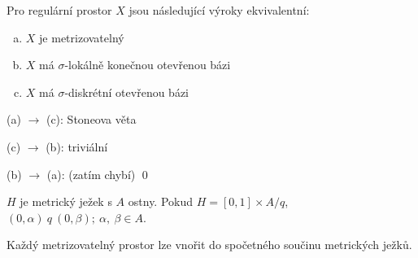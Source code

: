 \documentclass[12pt,a4paper]{article}
\newcommand{\head}[1]{\medskip\noindent {\bf #1}}
\begin{document}
 Pro regulární prostor $X$ jsou následující výroky
	ekvivalentní:
	\begin{enumerate}[(a)]
		\item $X$ je metrizovatelný
		\item $X$ má $\sigma$-lokálně konečnou otevřenou bázi
		\item $X$ má $\sigma$-diskrétní otevřenou bázi
	\end{enumerate}
\dukaz (a) $\rightarrow$ (c): Stoneova věta

(c) $\rightarrow$ (b): triviální

(b) $\rightarrow$ (a): (zatím chybí)
\qed

 $H$ je metrický ježek s $A$ ostny. Pokud $H = [0,1] \times A / q$, $(0, \alpha)~q~(0, \beta);~\alpha,~\beta \in A$.

\head {Důsledek:}
	Každý metrizovatelný prostor lze vnořit do spočetného součinu metrických
	ježků.
\end{document}
